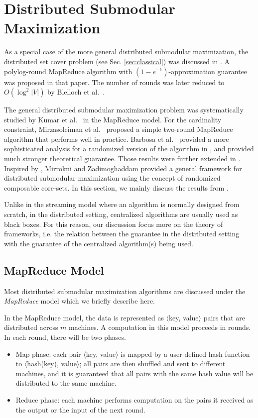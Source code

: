 \section{Distributed Submodular Maximization}
\label{sec:distributed}
As a special case of the more general distributed submodular maximization, the distributed set cover problem (see Sec. \ref{sec:classical}) was discussed in \cite{CKT10}. A polylog-round MapReduce algorithm with $(1-e^{-1})$-approximation guarantee was proposed in that paper. The number of rounds was later reduced to $O(\log^2 |V|)$  by Blelloch et al.\ \cite{BST12}. 

  The general distributed submodular maximization problem was systematically studied by Kumar et al.\ \cite{KMV+15} in the MapReduce model.  For the cardinality constraint, Mirzasoleiman et al.\ \cite{MKS+13} proposed a simple two-round MapReduce algorithm that performs well in practice. Barbosa et al.\ \cite{DEN+15} provided a more sophisticated analysis for a randomized version of the  algorithm in \cite{MKS+13}, and provided much stronger theoretical guarantee. Those results were further extended in \cite{BAN+2015new}. Inspired by \cite{MKS+13}, Mirrokni and Zadimoghaddam \cite{MZ15} provided a general framework for distributed submodular maximization using the concept of randomized composable core-sets. In this section, we mainly discuss the results from \cite{KMV+15,MKS+13,DEN+15,BAN+2015new,MZ15}.

Unlike in the streaming model  where an algorithm is normally designed from scratch, in the distributed setting, centralized algorithms are usually used as black boxes. For this reason, our discussion focus more on the theory of frameworks, i.e. the relation between the guarantee in the distributed setting with the guarantee of the centralized algorithm(s) being used.


\subsection{MapReduce Model}
Most distributed submodular maximization algorithms are discussed under the \emph{MapReduce} model \cite{DG08} which we briefly describe here.

In the MapReduce model, the data is represented as $\langle$key, value$\rangle$ pairs that are distributed across $m$ machines. A computation in this model proceeds in rounds. In each round, there will be two phases.
\begin{itemize}
\item Map phase: each pair $\langle$key, value$\rangle$ is mapped by a user-defined hash function to $\langle$hash(key), value$\rangle$; all pairs are then shuffled and sent to different machines, and it is guaranteed that all pairs with the same hash value  will be distributed to the same machine.
\item Reduce phase: each machine performs computation on the pairs it received as the output or the input of the next round.
\end{itemize}

